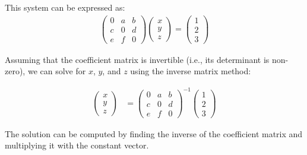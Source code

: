 \documentclass{article}
\begin{document}
\begin{enumerate}
          This system can be expressed as:
          \begin{align*}
              \begin{pmatrix}
                  0 & a & b \\
                  c & 0 & d \\
                  e & f & 0
              \end{pmatrix}
              \begin{pmatrix}
                  x \\
                  y \\
                  z
              \end{pmatrix}
              =
              \begin{pmatrix}
                  1 \\
                  2 \\
                  3
              \end{pmatrix}
          \end{align*}

          Assuming that the coefficient matrix is invertible (i.e., its determinant is non-zero), we can solve for $x$, $y$, and $z$ using the inverse matrix method:

          \begin{align*}
              \begin{pmatrix}
                  x \\
                  y \\
                  z
              \end{pmatrix}
               & = \begin{pmatrix}
                       0 & a & b \\
                       c & 0 & d \\
                       e & f & 0
                   \end{pmatrix}^{-1}
              \begin{pmatrix}
                  1 \\
                  2 \\
                  3
              \end{pmatrix}
          \end{align*}

          The solution can be computed by finding the inverse of the coefficient matrix and multiplying it with the constant vector.
\end{enumerate}
\end{document}
